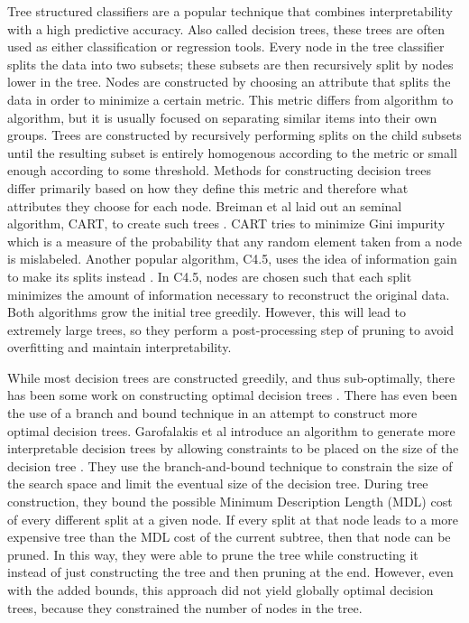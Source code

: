 Tree structured classifiers are a popular technique that combines interpretability with a high predictive accuracy.
Also called decision trees, these trees are often used as either classification or regression tools.
Every node in the tree classifier splits the data into two subsets; these subsets are then recursively split by nodes lower in the tree.
Nodes are constructed by choosing an attribute that splits the data in order to minimize a certain metric.
This metric differs from algorithm to algorithm, but it is usually focused on separating similar items into their own groups.%
Trees are constructed by recursively performing splits on the child subsets until the resulting subset is entirely homogenous according to the metric or small enough according to some threshold.
Methods for constructing decision trees differ primarily based on how they define this metric and therefore what attributes they choose for each node.
Breiman et al laid out an seminal algorithm, CART, to create such trees \cite{BreimanFrOlSt84}.
CART tries to minimize Gini impurity which is a measure of the probability that any random element taken from a node is mislabeled.
Another popular algorithm, C4.5, uses the idea of information gain to make its splits instead \cite{Quinlan93}.
In C4.5, nodes are chosen such that each split minimizes the amount of information necessary to reconstruct the original data.
Both algorithms grow the initial tree greedily.
However, this will lead to extremely large trees, so they perform a post-processing step of pruning to avoid overfitting and maintain interpretability.

While most decision trees are constructed greedily, and thus sub-optimally, there has been some work on constructing optimal decision trees \cite{Moret82}.
There has even been the use of a branch and bound technique in an attempt to construct more optimal decision trees.
Garofalakis et al introduce an algorithm to generate more interpretable decision trees by allowing constraints to be placed on the size of the decision tree \cite{GarofalakisHyRaSh00}.
They use the branch-and-bound technique to constrain the size of the search space and limit the eventual size of the decision tree.
During tree construction, they bound the possible Minimum Description Length (MDL) cost of every different split at a given node.
If every split at that node leads to a more expensive tree than the MDL cost of the current subtree, then that node can be pruned.
In this way, they were able to prune the tree while constructing it instead of just constructing the tree and then pruning at the end.
However, even with the added bounds, this approach did not yield globally optimal decision trees, because they constrained the number of nodes in the tree.

